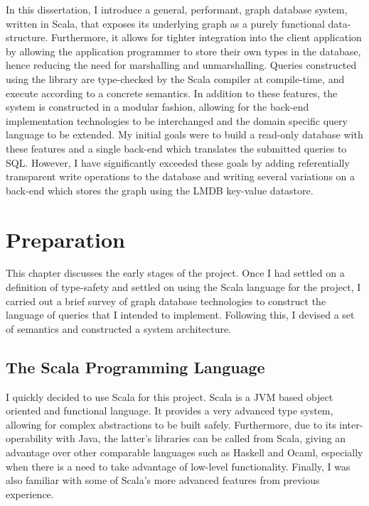 \documentclass[12pt,a4paper,twoside,openright]{report}
\begin{document}
In this dissertation, I introduce a general, performant, graph database system, written in Scala, that exposes its underlying graph as a purely functional data-structure. Furthermore, it allows for tighter integration into the client application by allowing the application programmer to store their own types in the database, hence reducing the need for marshalling and unmarshalling. Queries constructed using the library are type-checked by the Scala compiler at compile-time, and execute according to a concrete semantics. In addition to these features, the system is constructed in a modular fashion, allowing for the back-end implementation technologies to be interchanged and the domain specific query language to be extended. My initial goals were to build a read-only database with these features and a single back-end which translates the submitted queries to SQL. However, I have significantly exceeded these goals by adding referentially transparent write operations to the database and writing several variations on a back-end which stores the graph using the LMDB key-value datastore.

\chapter{Preparation}

This chapter discusses the early stages of the project. Once I had settled on a definition of type-safety and settled on using the Scala language for the project, I carried out a brief survey of graph database technologies to construct the language of queries that I intended to implement. Following this, I devised a set of semantics and constructed a system architecture.

\section{The Scala Programming Language}
I quickly decided to use Scala for this project. Scala is a JVM based object oriented and functional language. It provides a very advanced type system, allowing for complex abstractions to be built safely. Furthermore, due to its inter-operability with Java, the latter's libraries can be called from Scala, giving an advantage over other comparable languages such as Haskell and Ocaml, especially when there is a need to take advantage of low-level functionality. Finally, I was also familiar with some of Scala's more advanced features from previous experience.
\end{document}
